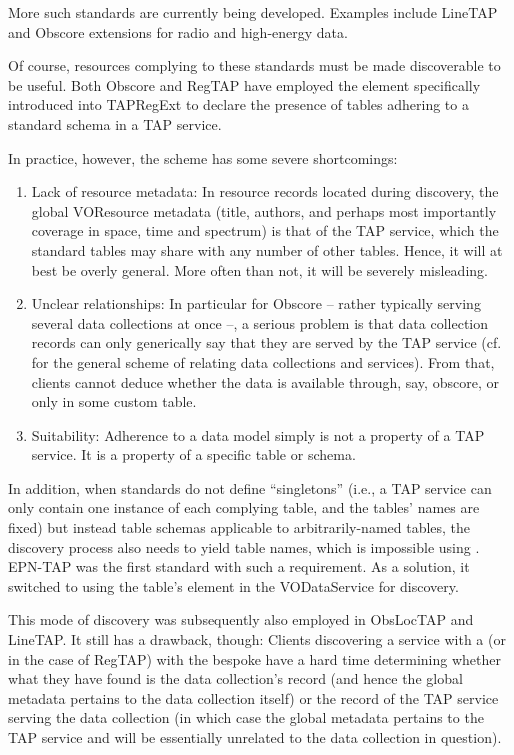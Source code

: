 \documentclass[11pt,a4paper]{ivoa}
\begin{document}
More such standards are currently being developed. Examples include LineTAP
\citep{wd:linetap23} and Obscore extensions for radio and high-energy data.

Of course, resources complying to these standards must be made
discoverable to be useful.  Both Obscore and RegTAP have employed the
 element specifically introduced into TAPRegExt
\citep{2012ivoa.spec.0827D} to declare the presence of tables adhering
to a standard schema in a TAP service.

In practice, however, the  scheme
has some severe shortcomings:

\begin{enumerate}
\item Lack of resource metadata: In resource records located during
discovery, the global VOResource metadata (title, authors, and perhaps
most importantly coverage in space, time and spectrum) is that of the
TAP service, which the standard tables may share with any number of
other tables.  Hence, it will at best be overly general.  More often
than not, it will be severely misleading.

\item Unclear relationships: In particular for Obscore -- rather
typically serving several data collections at once --, a serious
problem is that data collection records can only generically say
that they are served by the TAP service (cf.~\citet{2019ivoa.spec.0520D}
for the general scheme of relating data collections and services).  From
that, clients cannot deduce whether the data is available through, say,
obscore, or only in some custom table.

\item Suitability: Adherence to a data model simply is not a property of a
TAP service.  It is a property of a specific table or schema.
\end{enumerate}

In addition, when standards do not define ``singletons'' (i.e., a TAP
service can only contain one instance of each
complying table, and the tables' names are
fixed) but instead table schemas applicable to arbitrarily-named tables,
the discovery process also needs to yield table names, which is
impossible using .
EPN-TAP was the first standard with such a requirement.  As a
solution, it switched to using the table's  element in
the VODataService \citep{2021ivoa.spec.1102D}  for
discovery.

This mode of discovery was subsequently also employed in ObsLocTAP and
LineTAP.  It still has a drawback, though: Clients discovering a service
with a  (or  in the case of RegTAP) with the
bespoke  have a hard time determining whether what they
have found is the data collection's record (and hence the global
metadata pertains to the data collection itself) or the record of the
TAP service serving the data collection (in which case the global
metadata pertains to the TAP service and will be essentially unrelated
to the data collection in question).
\end{document}

